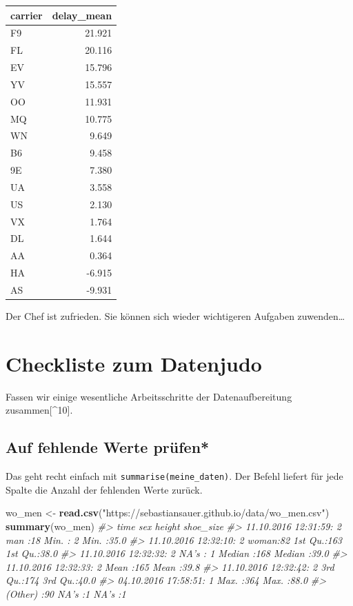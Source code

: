 \documentclass[12pt,]{book}
\newenvironment{Shaded}{\begin{snugshade}}{\end{snugshade}}
\newcommand{\KeywordTok}[1]{\textcolor[rgb]{0.13,0.29,0.53}{\textbf{{#1}}}}
\newcommand{\StringTok}[1]{\textcolor[rgb]{0.31,0.60,0.02}{{#1}}}
\newcommand{\CommentTok}[1]{\textcolor[rgb]{0.56,0.35,0.01}{\textit{{#1}}}}
\newcommand{\NormalTok}[1]{{#1}}
\begin{document}
\begin{tabular}{l|r}
\hline
carrier & delay\_mean\\
\hline
F9 & 21.921\\
\hline
FL & 20.116\\
\hline
EV & 15.796\\
\hline
YV & 15.557\\
\hline
OO & 11.931\\
\hline
MQ & 10.775\\
\hline
WN & 9.649\\
\hline
B6 & 9.458\\
\hline
9E & 7.380\\
\hline
UA & 3.558\\
\hline
US & 2.130\\
\hline
VX & 1.764\\
\hline
DL & 1.644\\
\hline
AA & 0.364\\
\hline
HA & -6.915\\
\hline
AS & -9.931\\
\hline
\end{tabular}

Der Chef ist zufrieden. Sie können sich wieder wichtigeren Aufgaben
zuwenden\ldots{}

\section{Checkliste zum Datenjudo}\label{checkliste-zum-datenjudo}

Fassen wir einige wesentliche Arbeitsschritte der Datenaufbereitung
zusammen{[}\^{}10{]}.

\subsection{Auf fehlende Werte prüfen*}\label{auf-fehlende-werte-prufen}

Das geht recht einfach mit \texttt{summarise(meine\_daten)}. Der Befehl
liefert für jede Spalte die Anzahl der fehlenden Werte zurück.

\begin{Shaded}
\begin{Highlighting}[]
\NormalTok{wo_men <-}\StringTok{ }\KeywordTok{read.csv}\NormalTok{(}\StringTok{"https://sebastiansauer.github.io/data/wo_men.csv"}\NormalTok{)}
\KeywordTok{summary}\NormalTok{(wo_men)}
\CommentTok{#>                   time       sex         height      shoe_size   }
\CommentTok{#>  11.10.2016 12:31:59: 2   man  :18   Min.   :  2   Min.   :35.0  }
\CommentTok{#>  11.10.2016 12:32:10: 2   woman:82   1st Qu.:163   1st Qu.:38.0  }
\CommentTok{#>  11.10.2016 12:32:32: 2   NA's : 1   Median :168   Median :39.0  }
\CommentTok{#>  11.10.2016 12:32:33: 2              Mean   :165   Mean   :39.8  }
\CommentTok{#>  11.10.2016 12:32:42: 2              3rd Qu.:174   3rd Qu.:40.0  }
\CommentTok{#>  04.10.2016 17:58:51: 1              Max.   :364   Max.   :88.0  }
\CommentTok{#>  (Other)            :90              NA's   :1     NA's   :1}
\end{Highlighting}
\end{Shaded}
\end{document}
